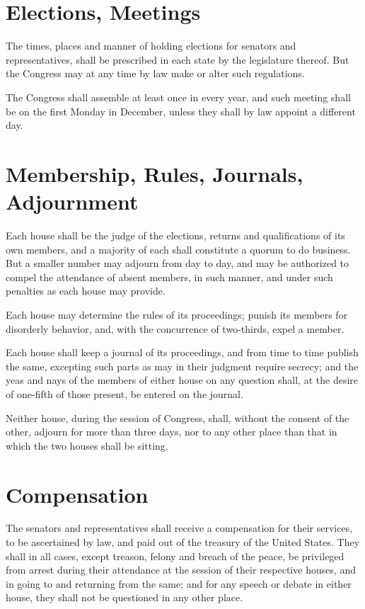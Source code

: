 \documentclass{constitution}
\begin{document}
\section{Elections, Meetings}
The times, places and manner of holding elections for senators and representatives, shall be prescribed in each state by the legislature thereof.
But the Congress may at any time by law make or alter such regulations.

The Congress shall assemble at least once in every year,
and such meeting shall be on the first Monday in December,
unless they shall by law appoint a different day.

\section{Membership, Rules, Journals, Adjournment}
Each house shall be the judge of the elections, returns and qualifications of its own members,
and a majority of each shall constitute a quorum to do business.
But a smaller number may adjourn from day to day,
and may be authorized to compel the attendance of absent members, in such manner, and under such penalties as each house may provide.

Each house may determine the rules of its proceedings;
punish its members for disorderly behavior,
and, with the concurrence of two-thirds, expel a member.

Each house shall keep a journal of its proceedings,
and from time to time publish the same,
excepting such parts as may in their judgment require secrecy;
and the yeas and nays of the members of either house on any question shall, at the desire of one-fifth of those present, be entered on the journal.

Neither house, during the session of Congress, shall, without the consent of the other, adjourn for more than three days, nor to any other place than that in which the two houses shall be sitting.

\section{Compensation}
The senators and representatives shall receive a compensation for their services, to be ascertained by law, and paid out of the treasury of the United States.
They shall in all cases, except treason, felony and breach of the peace, be privileged from arrest during their attendance at the session of their respective houses, and in going to and returning from the same;
and for any speech or debate in either house, they shall not be questioned in any other place.
\end{document}
